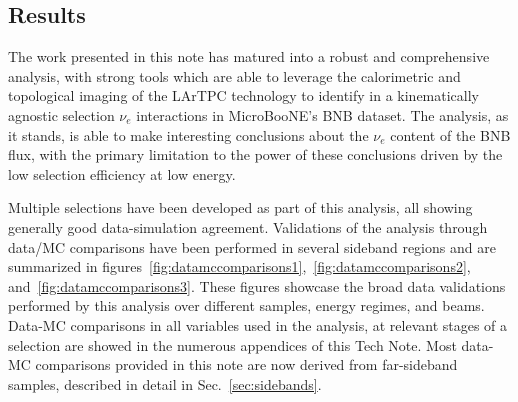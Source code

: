 \subsection{Results}
\label{sec:introduction:conclusions}
\par The work presented in this note has matured into a robust and comprehensive analysis, with strong tools which are able to leverage the calorimetric and topological imaging of the LArTPC technology to identify in a kinematically agnostic selection $\nu_e$ interactions in MicroBooNE's BNB dataset. The analysis, as it stands, is able to make interesting conclusions about the $\nu_e$ content of the BNB flux, with the primary limitation to the power of these conclusions driven by the low selection efficiency at low energy.
\par Multiple selections have been developed as part of this analysis, all showing generally good data-simulation agreement. Validations of the analysis through data/MC comparisons have been performed in several sideband regions and are summarized in figures~\ref{fig:datamccomparisons1},~\ref{fig:datamccomparisons2}, and~\ref{fig:datamccomparisons3}. These figures showcase the broad data validations performed by this analysis over different samples, energy regimes, and beams. Data-MC comparisons in all variables used in the analysis, at relevant stages of a selection are showed in the numerous appendices of this Tech Note. Most data-MC comparisons provided in this note are now derived from far-sideband samples, described in detail in Sec.~\ref{sec:sidebands}. %

